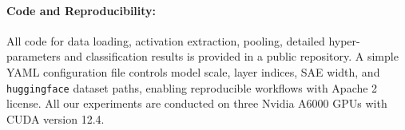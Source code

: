 \paragraph{Code and Reproducibility:}
All code for data loading, activation extraction, pooling, detailed hyper-parameters and classification results is provided in a public repository. A simple YAML configuration file controls model scale, layer indices, SAE width, and \texttt{huggingface} dataset paths, enabling reproducible workflows with Apache 2 license. All our experiments are conducted on three Nvidia A6000 GPUs with CUDA version 12.4. 
